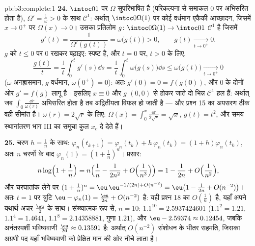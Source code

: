 \begin{solution}{pb:b3:complete:1}
\textbf{24.} $\intoc01$ पर $\Omega$ सुपरिभाषित है (परिकल्पना से समाकल $0$
पर अभिसरित होता है), $\Omega' = \frac1\omega > 0$ के साथ $\mathcal C^1$: अर्थात् $\intoc0{\Omega(1)}$ पर कोई वर्धमान
एकैकी आच्छादन, जिसमें $x \to 0^+$ पर $\Omega(x) \to 0$। उसका प्रतिलोम $g \colon \intoc0{\Omega(1)} \to \intoc01$ $\mathcal C^1$ है
जिसमें
\[
g'(t) = \frac1{\Omega'(g(t))} = \omega\bigl(g(t)\bigr) > 0,
\qquad g(t) \xrightarrow[t \to 0^+]{} 0 .
\]
$g$ को $t \leq 0$ पर $0$ रखकर बढ़ाइए:  स्पष्ट है, और $t = 0$ पर,
$t > 0$ के लिए,
\[
\frac{g(t)}t = \frac1t\int_0^tg'(s)\dd s
= \frac1t\int_0^t\omega\bigl(g(s)\bigr)\dd s
\leq \omega\bigl(g(t)\bigr) \xrightarrow[t\to0^+]{} 0
\]
($\omega$ अनह्रासमान, $g$ वर्धमान, $\omega(0^+) = 0$): अतः $g'(0) = 0 = f(g(0))$, और $0$ के
दोनों ओर $g' = f(g)$ लागू है। इसलिए $x \equiv 0$ और $g$ $(0, 0)$ से होकर जाते दो
भिन्न $\mathcal
C^1$ हल हैं: अर्थात् जब $\int_0\frac{\dd r}
{\omega(r)}$ अभिसरित होता है तब अद्वितीयता
विफल हो जाती है --- और प्रश्न 15 का अपसरण ठीक वही सीमांत है। $\omega(r) = 2\sqrt
r$
के लिए: $\Omega(x) = \int_0^x\frac{\dd r}{2\sqrt r} = \sqrt x$, $g(t) = t^2$, और समय स्थानांतरण भाग III का समूचा कुल $x_c$
दे देते हैं।

\textbf{25.} चरण $h = \frac1n$ के साथ: $\varphi_n(t_{k+1}) =
\varphi_n(t_k) + h\,\varphi_n(t_k) = (1 + h)\varphi_n(t_k)$, अतः $n$ चरणों के बाद $\varphi_n(1) = (1 + \frac1n)^n$।
प्रसार:
\[
n\log\Bigl(1 + \frac1n\Bigr)
= n\Bigl(\frac1n - \frac1{2n^2} + O\Bigl(\frac1{n^3}\Bigr)
\Bigr) = 1 - \frac1{2n} + O\Bigl(\frac1{n^2}\Bigr),
\]
और चरघातांक लेने पर $(1 + \frac1n)^n = \eu\,\eu^{-1/(2n) +
O(n^{-2})} = \eu\bigl(1 - \frac1{2n} + O(n^{-2})\bigr)$। अतः $t = 1$ पर त्रुटि $\eu - \varphi_n(1) =
\frac{\eu}{2n} + O(n^{-2})$ है: यही प्रश्न
18 का $O(\frac1n)$ है, यहाँ अपने यथार्थ अचर $\frac\eu2$ के साथ। संख्यात्मक रूप
से, $n =
10$: $1.1^{10} = 2.5937424601$ ($1.1^2 = 1.21$, $1.1^4 =
1.4641$, $1.1^8 = 2.14358881$, गुणा $1.21$), और $\eu -
2.59374 \approx 0.12454$, जबकि
अनंतस्पर्शी भविष्यवाणी $\frac{\eu}{20} \approx 0.13591$ है: अर्थात् $O(n^{-2})$ संशोधन के भीतर सहमति,
जिसका अग्रणी पद यहाँ भविष्यवाणी को प्रेक्षित मान की ओर नीचे लाता
है।
\end{solution}

